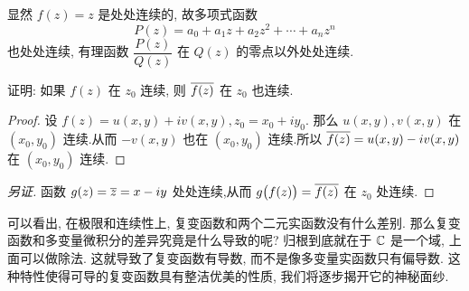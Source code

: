 显然 $f(z)=z$ 是处处连续的, 故多项式函数
\[P(z)=a_0+a_1z+a_2z^2+\cdots+a_nz^n\]
也处处连续, 有理函数 $\dfrac{P(z)}{Q(z)}$ 在 $Q(z)$ 的零点以外处处连续.

\begin{example}
  证明: 如果 $f(z)$ 在 $z_0$ 连续, 则 $\overline{f(z)}$ 在 $z_0$ 也连续.
\end{example}

\begin{proof}
  设 $f(z)=u(x,y)+iv(x,y),z_0=x_0+iy_0$.
  那么 $u(x,y),v(x,y)$ 在 $(x_0,y_0)$ 连续.从而 $-v(x,y)$ 也在 $(x_0,y_0)$ 连续.所以 $\overline{f(z)}=u(x,y)-iv(x,y)$ 在 $(x_0,y_0)$ 连续.
\end{proof}
\begin{proof}[另证]
  函数 $g(z)=\overline z=x-iy$ 处处连续,从而 $g\bigl(f(z)\bigr)=\overline{f(z)}$ 在 $z_0$ 处连续.
\end{proof}

可以看出, 在极限和连续性上, 复变函数和两个二元实函数没有什么差别.
那么复变函数和多变量微积分的差异究竟是什么导致的呢?
归根到底就在于 ${\mathbb{C}}$ 是一个域, 上面可以做除法.
这就导致了复变函数有\alert{导数}, 而不是像多变量实函数只有偏导数.
这种特性使得可导的复变函数具有整洁优美的性质, 我们将逐步揭开它的神秘面纱.

